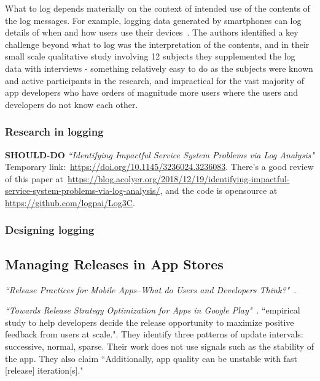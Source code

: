 What to log depends materially on the context of intended use of the contents of the log messages. For example, logging data generated by smartphones can log details of when and how users use their devices~\citep{ormen2015_smartphone_log_data_qualitative_perspective}. The authors identified a key challenge beyond what to log was the interpretation of the contents, and in their small scale qualitative study involving 12 subjects they supplemented the log data with interviews - something relatively easy to do as the subjects were known and active participants in the research, and impractical for the vast majority of app developers who have orders of magnitude more users where the users and developers do not know each other.




\subsubsection{Research in logging}
\textbf{SHOULD-DO} \emph{``Identifying Impactful Service System Problems via Log Analysis"} Temporary link:~\url{https://doi.org/10.1145/3236024.3236083}. There's a good review of this paper at~\url{https://blog.acolyer.org/2018/12/19/identifying-impactful-service-system-problems-via-log-analysis/}, and the code is opensource at \url{https://github.com/logpai/Log3C}.


\subsubsection{Designing logging}


\subsection{Managing Releases in App Stores}

\emph{``Release Practices for Mobile Apps--What do Users and Developers Think?"}~\cite{nayebi2016release}.
    
\emph{``Towards Release Strategy Optimization for Apps in Google Play"}~\citep{shen2017_towards_release_strategy_optimization_for_apps_in_google_play}. ``empirical study to help developers decide the release opportunity to maximize positive feedback from users at scale.". They identify three patterns of update intervals: successive, normal, sparse. Their work does not use signals such as the stability of the app. They also claim ``Additionally, app quality can be unstable with fast [release] iteration[s]."

